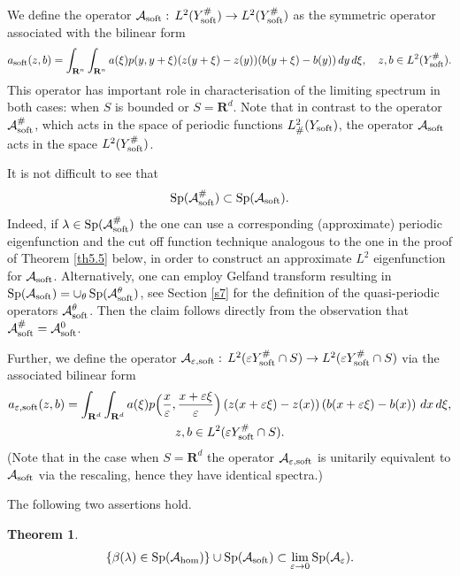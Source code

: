 \documentclass[11pt]{article}
\newcommand\e {\varepsilon}
\newcommand\soft{{\rm soft}}
\newcommand{\R}{\mathbf{R}}
\def\AA{\mathcal{A}}
\def\l{\lambda}
\def\hom{{\rm hom}}
\DeclareMathOperator{\Sp}{Sp}
\newtheorem{theorem}{Theorem}[section]
\theoremstyle{remark}
\begin{document}
We define the operator $\AA_\soft:\,L^2(Y^\#_\soft) \to L^2(Y^\#_\soft)$ as the symmetric operator associated with the bilinear form
\begin{eqnarray*}%
	a_\soft(z,b)= \int_{\R^n}\int_{\R^n}  a(\xi)p(y, y+\xi)(z(y+\xi)-z(y))(b(y+\xi)-b(y)) \,dy\,d\xi,
	\quad z,b \in L^2(Y^\#_\soft).
\end{eqnarray*}
This operator has important role in characterisation of the limiting spectrum in both cases: when $S$ is bounded or $S=\R^d$.
Note that in contrast to the operator $\AA_\soft^\#$, which acts in the space of periodic functions $L^2_\#(Y_\soft)$, the operator $\AA_\soft$ acts in the space    $L^2(Y_\soft^\#)$.

It is not difficult to see that
\begin{equation*}%
	\Sp(\AA_\soft^\#) \subset \Sp(\AA_\soft).
\end{equation*}
Indeed, if $\l \in \Sp(\AA_\soft^\#)$ the one can use a corresponding (approximate) periodic eigenfunction and the cut off function technique analogous to the one in the proof of Theorem \ref{th5.5} below, in order to construct an approximate $L^2$ eigenfunction for $\AA_\soft$. Alternatively, one can employ Gelfand transform resulting in $\Sp(\AA_\soft) = \cup_\theta \Sp(\AA_\soft^\theta)$, see Section  \ref{s7} for the definition of the quasi-periodic operators $\AA_\soft^\theta$. Then the claim follows directly from the observation that $\AA_\soft^\# = \AA_\soft^0$.

Further, we define the operator  $\AA_{\e,\rm soft}:\,L^2(\e Y^\#_\soft \cap S) \to L^2(\e Y^\#_\soft\cap S)$ via the associated bilinear form
\begin{multline}\label{21}
	a_{\e,\rm soft}(z,b)= \int_{\R^d}\int_{\R^d}  a(\xi)p\Big(\frac{x}\e , \frac{x+\e\xi}\e \Big)\left(z(x+\e \xi)-z(x)\right)\left(b(x+\e\xi)-b(x)\right) \,dx\,d\xi,
	\\
	z,b \in L^2(\e Y^\#_\soft \cap S).
\end{multline} 	
 (Note that in the case when $S=\R^d$ the operator $\AA_{\e,\rm soft}$ is unitarily equivalent to  $\AA_\soft$ via the rescaling, hence they have identical spectra.)

The following two assertions hold.


\begin{theorem}\label{th2.5}
	\begin{equation}\label{20}
		\{\beta(\l) \in \Sp (\AA_\hom)\} \cup \Sp(\AA_\soft) \subset \lim_{\e\to 0} \Sp(\AA_\e).
	\end{equation}
\end{theorem}
\end{document}
